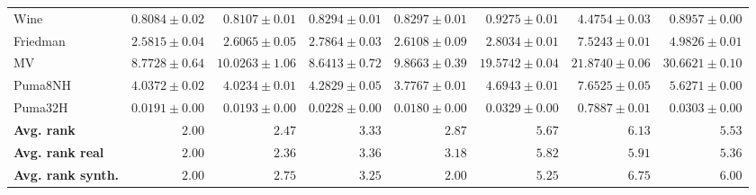 \begin{table*}[!htbp]
{\begin{tabular}{lrrrrrrr}
		Wine & $\mathbf{0.8084 \pm 0.02}$ & $0.8107 \pm 0.01$ & $0.8294 \pm 0.01$ & $0.8297 \pm 0.01$ & $0.9275 \pm 0.01$ & $4.4754 \pm 0.03$ & $0.8957 \pm 0.00$\\
		Friedman & $\mathbf{2.5815 \pm 0.04}$ & $2.6065 \pm 0.05$ & $2.7864 \pm 0.03$ & $2.6108 \pm 0.09$ & $2.8034 \pm 0.01$ & $7.5243 \pm 0.01$ & $4.9826 \pm 0.01$\\
		MV & $8.7728 \pm 0.64$ & $10.0263 \pm 1.06$ & $\mathbf{8.6413 \pm 0.72}$ & $9.8663 \pm 0.39$ & $19.5742 \pm 0.04$ & $21.8740 \pm 0.06$ & $30.6621 \pm 0.10$\\
		Puma8NH & $4.0372 \pm 0.02$ & $4.0234 \pm 0.01$ & $4.2829 \pm 0.05$ & $\mathbf{3.7767 \pm 0.01}$ & $4.6943 \pm 0.01$ & $7.6525 \pm 0.05$ & $5.6271 \pm 0.00$\\
		Puma32H & $0.0191 \pm 0.00$ & $0.0193 \pm 0.00$ & $0.0228 \pm 0.00$ & $\mathbf{0.0180 \pm 0.00}$ & $0.0329 \pm 0.00$ & $0.7887 \pm 0.01$ & $0.0303 \pm 0.00$\\
		\midrule
		\textbf{{Avg. rank}} & $\mathbf{2.00}$ & $2.47$ & $3.33$ & $2.87$ & $5.67$ & $6.13$ & $5.53$\\
		\textbf{{Avg. rank real}} & $\mathbf{2.00}$ & $2.36$ & $3.36$ & $3.18$ & $5.82$ & $5.91$ & $5.36$\\
		\textbf{{Avg. rank synth.}} & $\mathbf{2.00}$ & $2.75$ & $3.25$ & $\mathbf{2.00}$ & $5.25$ & $6.75$ & $6.00$\\
		\bottomrule
	\end{tabular}}
\end{table*}
